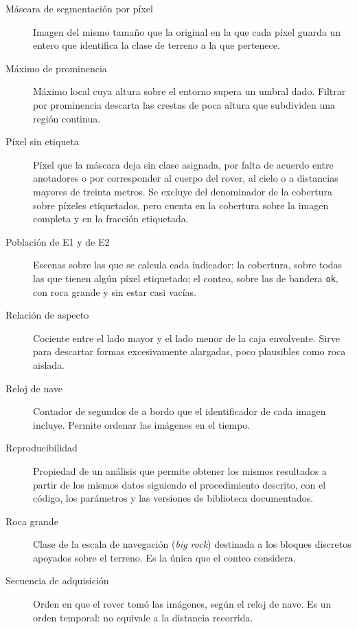 {\begin{description}
  \item[Máscara de segmentación por píxel] Imagen del mismo tamaño que la original
    en la que cada píxel guarda un entero que identifica la clase de terreno a la
    que pertenece.

  \item[Máximo de prominencia] Máximo local cuya altura sobre el entorno supera un
    umbral dado. Filtrar por prominencia descarta las crestas de poca altura que
    subdividen una región continua.

  \item[Píxel sin etiqueta] Píxel que la máscara deja sin clase asignada, por falta
    de acuerdo entre anotadores o por corresponder al cuerpo del rover, al cielo o
    a distancias mayores de treinta metros. Se excluye del denominador de la
    cobertura sobre píxeles etiquetados, pero cuenta en la cobertura sobre la
    imagen completa y en la fracción etiquetada.

  \item[Población de E1 y de E2] Escenas sobre las que se calcula cada indicador:
    la cobertura, sobre todas las que tienen algún píxel etiquetado; el conteo,
    sobre las de bandera \texttt{ok}, con roca grande y sin estar casi vacías.

  \item[Relación de aspecto] Cociente entre el lado mayor y el lado menor de la
    caja envolvente. Sirve para descartar formas excesivamente alargadas, poco
    plausibles como roca aislada.

  \item[Reloj de nave] Contador de segundos de a bordo que el identificador de cada
    imagen incluye. Permite ordenar las imágenes en el tiempo.

  \item[Reproducibilidad] Propiedad de un análisis que permite obtener los mismos
    resultados a partir de los mismos datos siguiendo el procedimiento descrito,
    con el código, los parámetros y las versiones de biblioteca documentados.

  \item[Roca grande] Clase de la escala de navegación (\textit{big rock}) destinada
    a los bloques discretos apoyados sobre el terreno. Es la única que el conteo
    considera.

  \item[Secuencia de adquisición] Orden en que el rover tomó las imágenes, según el
    reloj de nave. Es un orden temporal: no equivale a la distancia recorrida.


\end{description}}
